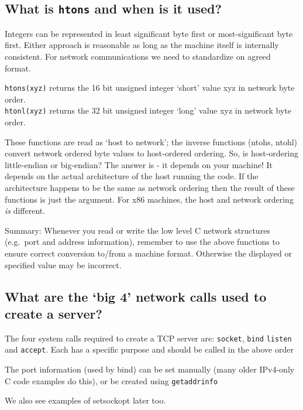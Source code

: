 \subsection{\texorpdfstring{What is \texttt{htons} and when is it
used?}{What is htons and when is it used?}}\label{what-is-htons-and-when-is-it-used}

Integers can be represented in least significant byte first or
most-significant byte first. Either approach is reasonable as long as
the machine itself is internally consistent. For network communications
we need to standardize on agreed format.

\texttt{htons(xyz)} returns the 16 bit unsigned integer `short' value
xyz in network byte order.\\\texttt{htonl(xyz)} returns the 32 bit
unsigned integer `long' value xyz in network byte order.

These functions are read as `host to network'; the inverse functions
(ntohs, ntohl) convert network ordered byte values to host-ordered
ordering. So, is host-ordering little-endian or big-endian? The answer
is - it depends on your machine! It depends on the actual architecture
of the host running the code. If the architecture happens to be the same
as network ordering then the result of these functions is just the
argument. For x86 machines, the host and network ordering \emph{is}
different.

Summary: Whenever you read or write the low level C network structures
(e.g.~port and address information), remember to use the above functions
to ensure correct conversion to/from a machine format. Otherwise the
displayed or specified value may be incorrect.

\subsection{\texorpdfstring{What are the `big 4' network calls used to
create a
server?}{What are the big 4 network calls used to create a server?}}\label{what-are-the-big-4-network-calls-used-to-create-a-server}

The four system calls required to create a TCP server are:
\texttt{socket}, \texttt{bind} \texttt{listen} and \texttt{accept}. Each
has a specific purpose and should be called in the above order

The port information (used by bind) can be set manually (many older
IPv4-only C code examples do this), or be created using
\texttt{getaddrinfo}

We also see examples of setsockopt later too.

